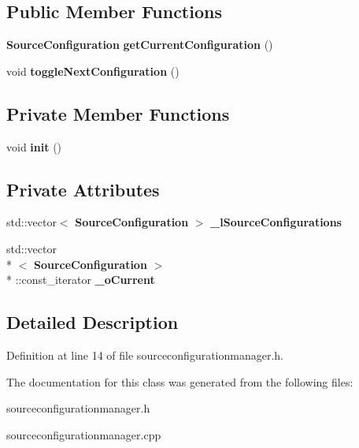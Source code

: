 \subsection*{Public Member Functions}
\begin{DoxyCompactItemize}
\item 
{\bf Source\-Configuration} {\bfseries get\-Current\-Configuration} ()\label{classSoundfieldViewer_1_1SourceConfigurationManager_af062ad8b07167a1d078b8d413bc0eede}

\item 
void {\bfseries toggle\-Next\-Configuration} ()\label{classSoundfieldViewer_1_1SourceConfigurationManager_aba960aaa8f0823d25ec5e0314825c9d5}

\end{DoxyCompactItemize}
\subsection*{Private Member Functions}
\begin{DoxyCompactItemize}
\item 
void {\bfseries init} ()\label{classSoundfieldViewer_1_1SourceConfigurationManager_a7c514afb5f31174059bc6c9b7119cb6f}

\end{DoxyCompactItemize}
\subsection*{Private Attributes}
\begin{DoxyCompactItemize}
\item 
std\-::vector$<$ {\bf Source\-Configuration} $>$ {\bfseries \-\_\-l\-Source\-Configurations}\label{classSoundfieldViewer_1_1SourceConfigurationManager_a5b4337fb3e2de8833cc98009b90b8b82}

\item 
std\-::vector\\*
$<$ {\bf Source\-Configuration} $>$\\*
\-::const\-\_\-iterator {\bfseries \-\_\-o\-Current}\label{classSoundfieldViewer_1_1SourceConfigurationManager_a584d5a6a3fae9d9e4ba40879e129fec7}

\end{DoxyCompactItemize}


\subsection{Detailed Description}


Definition at line 14 of file sourceconfigurationmanager.\-h.



The documentation for this class was generated from the following files\-:\begin{DoxyCompactItemize}
\item 
sourceconfigurationmanager.\-h\item 
sourceconfigurationmanager.\-cpp\end{DoxyCompactItemize}
